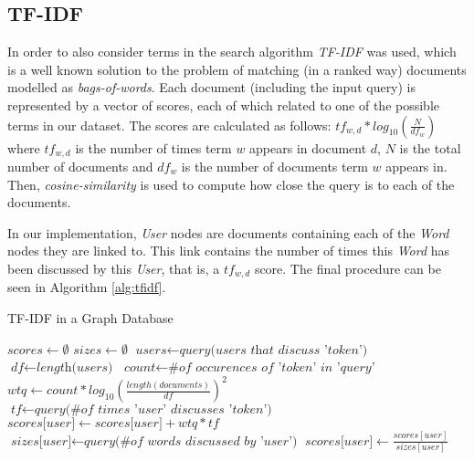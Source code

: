 \subsection{TF-IDF}


In order to also consider terms in the search algorithm \emph{TF-IDF} was used, 
which is a well known solution to the problem of matching (in a ranked
way) documents modelled as \emph{bags-of-words}. Each document (including the
input query) is represented by a vector of scores, each of which related to one
of the possible terms in our dataset. The scores are calculated as follows:
${tf}_{w, d} * log_{10}(\frac{N}{{df}_{w}})$ where ${tf}_{w, d}$ is the number
of times term $w$ appears in document $d$, $N$ is the total number of documents
and ${df}_{w}$ is the number of documents term $w$ appears in. Then,
\emph{cosine-similarity} is used to compute how close the query is to each of
the documents.

In our implementation, \emph{User} nodes are documents containing each of the
\emph{Word} nodes they are linked to. This link contains the number of times
this \emph{Word} has been discussed by this \emph{User}, that is, a ${tf}_{w,
d}$ score. The final procedure can be seen in Algorithm \ref{alg:tfidf}.

\begin{algorithm}
\caption{TF-IDF in a Graph Database}\label{alg:tfidf}
\begin{algorithmic}[1]
    \State $\textit{scores} \gets \emptyset$
    \State $\textit{sizes} \gets \emptyset$
        \State $\textit{users} \gets \textit{query(users that discuss 'token')}$
        \State $\textit{df} \gets \textit{length(users)}$
        \State $\textit{count} \gets \textit{\# of occurences of 'token' in 'query'}$
        \State $\textit{wtq} \gets \textit{$count * log_{10}(\frac{length(documents)}{df})^2$}$
        \State $\textit{tf} \gets \textit{query(\# of times 'user' discusses 'token')}$
          \State $\textit{scores[user]} \gets \textit{scores[user]} + wtq*tf$
          \State $\textit{sizes[user]} \gets \textit{query(\# of words discussed by 'user')}$
        \EndFor
    \EndFor
        \State $\textit{scores[user]} \gets \textit{$\frac{scores[user]}{sizes[user]}$}$
    \EndFor
    \State {}
\EndProcedure
\end{algorithmic}
\end{algorithm}
